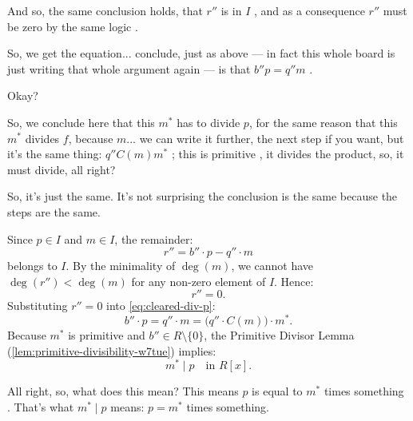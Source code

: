 \begin{proofWrapper}
\begin{speech}[00:30:34 - 00:31:52]
And so, the same conclusion holds, that $r''$ is in $I$ , and as a consequence $r''$ must be zero by the same logic .

So, we get the equation... conclude, just as above --- in fact this whole board is just writing that whole argument again --- is that $b'' p = q'' m$ .

Okay?

So, we conclude here that this $m^*$ has to divide $p$, for the same reason that this $m^*$ divides $f$, because $m$... we can write it further, the next step if you want, but it's the same thing: $q'' C(m) m^*$ ; this is primitive , it divides the product, so, it must divide, all right? 

So, it's just the same. It's not surprising the conclusion is the same because the steps are the same.
\end{speech}

\begin{content}
Since $p \in I$ and $m \in I$, the remainder:
\[
r'' = b'' \cdot p - q'' \cdot m
\]
belongs to $I$. By the minimality of $\deg(m)$, we cannot have $\deg(r'') < \deg(m)$ for any non-zero element of $I$. Hence:
\begin{equation}\label{eq:rdoubleprime-zero}
r'' = 0.
\end{equation}
Substituting $r'' = 0$ into \eqref{eq:cleared-div-p}:
\begin{equation}\label{eq:bdoubleprime-p-eq-qdoubleprime-m}
b'' \cdot p = q'' \cdot m = \bigl(q'' \cdot C(m)\bigr) \cdot m^*.
\end{equation}
Because $m^*$ is primitive and $b'' \in R \setminus \{0\}$, the Primitive Divisor Lemma (\cref{lem:primitive-divisibility-w7tue}) implies:
\begin{equation}\label{eq:mstar-divides-p}
\boxed{m^* \mid p} \quad \text{in } R[x].
\end{equation}
\end{content}

\begin{speech}[00:31:52 - 00:33:44]
All right, so, what does this mean? This means $p$ is equal to $m^*$ times something . That's what $m^* \mid p$ means: $p = m^*$ times something.


\end{speech}
\end{proofWrapper}
